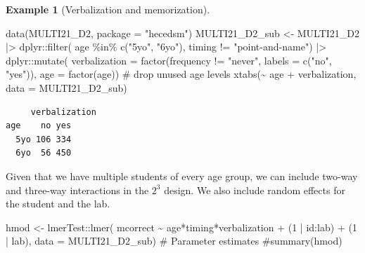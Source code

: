 \documentclass[
  11pt,
  letterpaper,
]{scrbook}
\newenvironment{Shaded}{\begin{snugshade}}{\end{snugshade}}
\newcommand{\AttributeTok}[1]{\textcolor[rgb]{0.40,0.45,0.13}{#1}}
\newcommand{\CommentTok}[1]{\textcolor[rgb]{0.37,0.37,0.37}{#1}}
\newcommand{\DecValTok}[1]{\textcolor[rgb]{0.68,0.00,0.00}{#1}}
\newcommand{\FunctionTok}[1]{\textcolor[rgb]{0.28,0.35,0.67}{#1}}
\newcommand{\NormalTok}[1]{\textcolor[rgb]{0.00,0.23,0.31}{#1}}
\newcommand{\OtherTok}[1]{\textcolor[rgb]{0.00,0.23,0.31}{#1}}
\newcommand{\SpecialCharTok}[1]{\textcolor[rgb]{0.37,0.37,0.37}{#1}}
\newcommand{\StringTok}[1]{\textcolor[rgb]{0.13,0.47,0.30}{#1}}
\theoremstyle{definition}
\theoremstyle{definition}
\newtheorem{example}{Example}[chapter]
\theoremstyle{remark}
\begin{document}
\begin{example}[Verbalization and
memorization]
\begin{Shaded}
\begin{Highlighting}[]
\FunctionTok{data}\NormalTok{(MULTI21\_D2, }\AttributeTok{package =} \StringTok{"hecedsm"}\NormalTok{)}
\NormalTok{MULTI21\_D2\_sub }\OtherTok{\textless{}{-}}\NormalTok{ MULTI21\_D2 }\SpecialCharTok{|\textgreater{}}
\NormalTok{  dplyr}\SpecialCharTok{::}\FunctionTok{filter}\NormalTok{(}
\NormalTok{    age }\SpecialCharTok{\%in\%} \FunctionTok{c}\NormalTok{(}\StringTok{"5yo"}\NormalTok{, }\StringTok{"6yo"}\NormalTok{),}
\NormalTok{    timing }\SpecialCharTok{!=} \StringTok{"point{-}and{-}name"}\NormalTok{) }\SpecialCharTok{|\textgreater{}}
\NormalTok{  dplyr}\SpecialCharTok{::}\FunctionTok{mutate}\NormalTok{(}
    \AttributeTok{verbalization =} \FunctionTok{factor}\NormalTok{(frequency }\SpecialCharTok{!=} \StringTok{"never"}\NormalTok{,}
                           \AttributeTok{labels =} \FunctionTok{c}\NormalTok{(}\StringTok{"no"}\NormalTok{, }\StringTok{"yes"}\NormalTok{)),}
    \AttributeTok{age =} \FunctionTok{factor}\NormalTok{(age)) }\CommentTok{\# drop unused age levels}
\FunctionTok{xtabs}\NormalTok{(}\SpecialCharTok{\textasciitilde{}}\NormalTok{ age }\SpecialCharTok{+}\NormalTok{ verbalization, }\AttributeTok{data =}\NormalTok{ MULTI21\_D2\_sub)}
\end{Highlighting}
\end{Shaded}

\begin{verbatim}
     verbalization
age    no yes
  5yo 106 334
  6yo  56 450
\end{verbatim}

Given that we have multiple students of every age group, we can include
two-way and three-way interactions in the \(2^3\) design. We also
include random effects for the student and the lab.

\begin{Shaded}
\begin{Highlighting}[]
\NormalTok{hmod }\OtherTok{\textless{}{-}}\NormalTok{ lmerTest}\SpecialCharTok{::}\FunctionTok{lmer}\NormalTok{(}
\NormalTok{  mcorrect }\SpecialCharTok{\textasciitilde{}}\NormalTok{ age}\SpecialCharTok{*}\NormalTok{timing}\SpecialCharTok{*}\NormalTok{verbalization }\SpecialCharTok{+}\NormalTok{ (}\DecValTok{1} \SpecialCharTok{|}\NormalTok{ id}\SpecialCharTok{:}\NormalTok{lab) }\SpecialCharTok{+}\NormalTok{ (}\DecValTok{1} \SpecialCharTok{|}\NormalTok{ lab), }
  \AttributeTok{data =}\NormalTok{ MULTI21\_D2\_sub)}
\CommentTok{\# Parameter estimates}
\CommentTok{\#summary(hmod)}
\end{Highlighting}
\end{Shaded}


\end{example}
\end{document}
